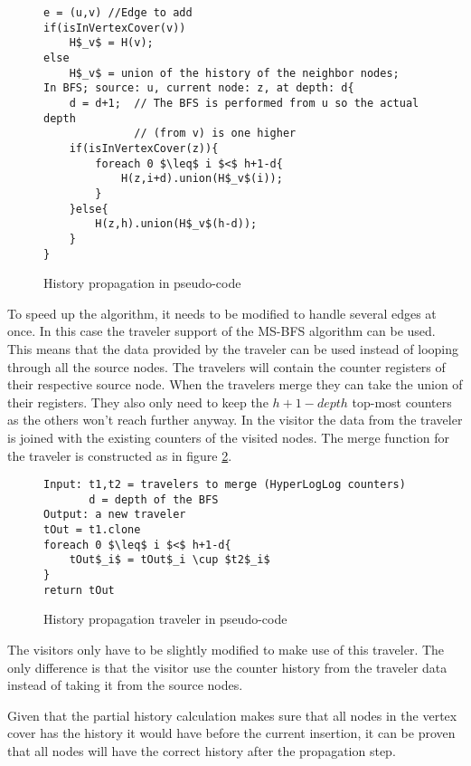\begin{figure}[h]
    \begin{lstlisting}[mathescape]
e = (u,v) //Edge to add
if(isInVertexCover(v))
    H$_v$ = H(v);
else
    H$_v$ = union of the history of the neighbor nodes;
In BFS; source: u, current node: z, at depth: d{
    d = d+1;  // The BFS is performed from u so the actual depth 
              // (from v) is one higher
    if(isInVertexCover(z)){
        foreach 0 $\leq$ i $<$ h+1-d{
            H(z,i+d).union(H$_v$(i));
        }
    }else{
        H(z,h).union(H$_v$(h-d));
    }
}
    \end{lstlisting}
    \caption{History propagation in pseudo-code}
    \label{fig:history_propagation_algorithm}
\end{figure}

To speed up the algorithm, it needs to be modified to handle several edges at once. In this case the traveler support of the MS-BFS algorithm can be used. This means that the data provided by the traveler can be used instead of looping through all the source nodes. The travelers will contain the counter registers of their respective source node. When the travelers merge they can take the union of their registers. They also only need to keep the $h+1-depth$ top-most counters as the others won't reach further anyway. In the visitor the data from the traveler is joined with the existing counters of the visited nodes. The merge function for the traveler is constructed as in figure \ref{fig:history_propagation_traveler}.

\begin{figure}[h]
    \begin{lstlisting}[mathescape]
Input: t1,t2 = travelers to merge (HyperLogLog counters)
       d = depth of the BFS
Output: a new traveler
tOut = t1.clone
foreach 0 $\leq$ i $<$ h+1-d{
    tOut$_i$ = tOut$_i \cup $t2$_i$
}
return tOut
    \end{lstlisting}
    \caption{History propagation traveler in pseudo-code}
    \label{fig:history_propagation_traveler}
\end{figure}

The visitors only have to be slightly modified to make use of this traveler. The only difference is that the visitor use the counter history from the traveler data instead of taking it from the source nodes.

Given that the partial history calculation makes sure that all nodes in the vertex cover has the history it would have before the current insertion, it can be proven that all nodes will have the correct history after the propagation step. \\

